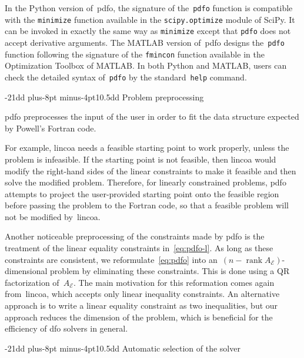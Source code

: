 \documentclass[
    smallextended,  %
    final,          %
]{svjour3}
\makeatletter
\DeclareMathOperator\rank{rank}
\newcommand{\aeq}{A_{\scriptscriptstyle\mathcal{E}}}
\newcommand{\pdfofun}{\texttt{pdfo}\xspace}
\def\subsection{\@startsection{subsection}{2}{\z@}%
    {-21dd plus-8pt minus-4pt}{10.5dd}
     {\normalsize\bfseries}}
\makeatother
\begin{document}
In the Python version of~\gls{pdfo}, the signature of the~\pdfofun function is compatible with
the \texttt{minimize} function available in the \texttt{scipy.optimize} module of
SciPy. It can be invoked in exactly
the same way as \texttt{minimize} except that \pdfofun does not accept derivative arguments.
The MATLAB version of~\gls{pdfo} designs the~\pdfofun function following the signature of
the \texttt{fmincon} function available in the Optimization Toolbox of MATLAB.
In both Python and MATLAB, users can check the detailed syntax of~\pdfofun by the
standard~\texttt{help} command.


\subsection{Problem preprocessing}
\label{subsec:pdfo-preprocessing}

\gls{pdfo} preprocesses the input of the user in order to fit the data structure expected by
Powell's Fortran code.

For example, \gls{lincoa} needs a feasible starting point to work properly, unless the problem is
infeasible. If the starting point is not feasible, then \gls{lincoa} would modify the right-hand
sides of the linear constraints to make it feasible and then solve the modified problem.
Therefore, for linearly constrained problems, \gls{pdfo} attempts to project the user-provided
starting point onto the feasible region before passing the problem to the Fortran code, so that
a feasible problem will not be modified by~\gls{lincoa}.

Another noticeable preprocessing of the constraints made by \gls{pdfo} is the treatment of the
linear equality constraints in~\eqref{eq:pdfo-l}.
As long as these constraints are consistent, we reformulate~\eqref{eq:pdfo} into
an~$(n - \rank \aeq)$-dimensional problem by eliminating these constraints.  This is done using a
QR factorization of~$\aeq$. The main motivation for this reformation comes again from~\gls{lincoa},
which accepts only linear inequality constraints. An alternative approach is to write a linear
equality constraint as two inequalities, but our approach reduces the dimension of the problem,
which is beneficial for the efficiency of \gls{dfo} solvers in general.


\subsection{Automatic selection of the solver}
\label{subsec:solver-selection}
\end{document}
